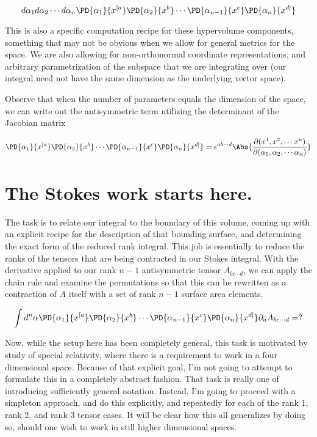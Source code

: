 \begin{equation}\label{eqn:stokesTensor:370}
d\alpha_1
d\alpha_2
\cdots
d\alpha_n
\PD{\alpha_1}{x^{[a}}
\PD{\alpha_2}{x^b}
\cdots
\PD{\alpha_{n-1}}{x^c}
\PD{\alpha_n}{x^{d]}}
\end{equation}

This is also a specific computation recipe for these hypervolume components, something that may not be obvious when we allow for general metrics for the space.  We are also allowing for non-orthonormal coordinate representations, and arbitrary parametrization of the subspace that we are integrating over (our integral need not have the same dimension as the underlying vector space).

Observe that when the number of parameters equals the dimension of the space, we can write out the antisymmetric term utilizing the determinant of the Jacobian matrix

\begin{equation}\label{eqn:stokesTensor:390}
\PD{\alpha_1}{x^{[a}}
\PD{\alpha_2}{x^b}
\cdots
\PD{\alpha_{n-1}}{x^c}
\PD{\alpha_n}{x^{d]}}
= \epsilon^{a b \cdots d} \Abs{ \frac{\partial(x^1, x^2, \cdots x^n)}{\partial(\alpha_1, \alpha_2, \cdots \alpha_n)} }
\end{equation}

\section{The Stokes work starts here.}

The task is to relate our integral to the boundary of this volume, coming up with an explicit recipe for the description of that bounding surface, and determining the exact form of the reduced rank integral.  This job is essentially to reduce the ranks of the tensors that are being contracted in our Stokes integral.  With the derivative applied to our rank $n-1$ antisymmetric tensor $A_{b c \cdots d}$, we can apply the chain rule and examine the permutations so that this can be rewritten as a contraction of $A$ itself with a set of rank $n-1$ surface area elements.

\begin{equation}\label{eqn:stokesTensor:410}
\int
d^n \alpha
\PD{\alpha_1}{x^{[a}}
\PD{\alpha_2}{x^b}
\cdots
\PD{\alpha_{n-1}}{x^c}
\PD{\alpha_n}{x^{d]}}
\partial_a A_{b c \cdots d} = ?
\end{equation}

Now, while the setup here has been completely general, this task is motivated by study of special relativity, where there is a requirement to work in a four dimensional space.  Because of that explicit goal, I'm not going to attempt to formulate this in a completely abstract fashion.  That task is really one of introducing sufficiently general notation.  Instead, I'm going to proceed with a simpleton approach, and do this explicitly, and repeatedly for each of the rank 1, rank 2, and rank 3 tensor cases.  It will be clear how this all generalizes by doing so, should one wish to work in still higher dimensional spaces.

